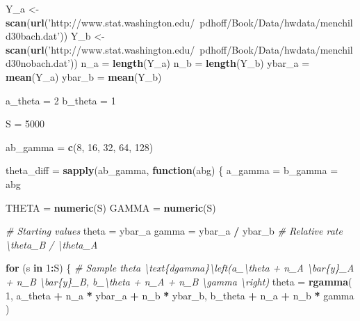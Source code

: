 \documentclass[]{article}
\newenvironment{Shaded}{\begin{snugshade}}{\end{snugshade}}
\newcommand{\CommentTok}[1]{\textcolor[rgb]{0.56,0.35,0.01}{\textit{#1}}}
\newcommand{\ControlFlowTok}[1]{\textcolor[rgb]{0.13,0.29,0.53}{\textbf{#1}}}
\newcommand{\DecValTok}[1]{\textcolor[rgb]{0.00,0.00,0.81}{#1}}
\newcommand{\KeywordTok}[1]{\textcolor[rgb]{0.13,0.29,0.53}{\textbf{#1}}}
\newcommand{\NormalTok}[1]{#1}
\newcommand{\OperatorTok}[1]{\textcolor[rgb]{0.81,0.36,0.00}{\textbf{#1}}}
\newcommand{\StringTok}[1]{\textcolor[rgb]{0.31,0.60,0.02}{#1}}
\begin{document}
\begin{Shaded}
\begin{Highlighting}[]
\NormalTok{Y_a <-}\StringTok{ }\KeywordTok{scan}\NormalTok{(}\KeywordTok{url}\NormalTok{(}\StringTok{'http://www.stat.washington.edu/~pdhoff/Book/Data/hwdata/menchild30bach.dat'}\NormalTok{))}
\NormalTok{Y_b <-}\StringTok{ }\KeywordTok{scan}\NormalTok{(}\KeywordTok{url}\NormalTok{(}\StringTok{'http://www.stat.washington.edu/~pdhoff/Book/Data/hwdata/menchild30nobach.dat'}\NormalTok{))}
\NormalTok{n_a =}\StringTok{ }\KeywordTok{length}\NormalTok{(Y_a)}
\NormalTok{n_b =}\StringTok{ }\KeywordTok{length}\NormalTok{(Y_b)}
\NormalTok{ybar_a =}\StringTok{ }\KeywordTok{mean}\NormalTok{(Y_a)}
\NormalTok{ybar_b =}\StringTok{ }\KeywordTok{mean}\NormalTok{(Y_b)}

\NormalTok{a_theta =}\StringTok{ }\DecValTok{2}
\NormalTok{b_theta =}\StringTok{ }\DecValTok{1}

\NormalTok{S =}\StringTok{ }\DecValTok{5000}

\NormalTok{ab_gamma =}\StringTok{ }\KeywordTok{c}\NormalTok{(}\DecValTok{8}\NormalTok{, }\DecValTok{16}\NormalTok{, }\DecValTok{32}\NormalTok{, }\DecValTok{64}\NormalTok{, }\DecValTok{128}\NormalTok{)}

\NormalTok{theta_diff =}\StringTok{ }\KeywordTok{sapply}\NormalTok{(ab_gamma, }\ControlFlowTok{function}\NormalTok{(abg) \{}
\NormalTok{  a_gamma =}\StringTok{ }\NormalTok{b_gamma =}\StringTok{ }\NormalTok{abg}

\NormalTok{  THETA =}\StringTok{ }\KeywordTok{numeric}\NormalTok{(S)}
\NormalTok{  GAMMA =}\StringTok{ }\KeywordTok{numeric}\NormalTok{(S)}

  \CommentTok{# Starting values}
\NormalTok{  theta =}\StringTok{ }\NormalTok{ybar_a}
\NormalTok{  gamma =}\StringTok{ }\NormalTok{ybar_a }\OperatorTok{/}\StringTok{ }\NormalTok{ybar_b  }\CommentTok{# Relative rate \textbackslash{}theta_B / \textbackslash{}theta_A}

  \ControlFlowTok{for}\NormalTok{ (s }\ControlFlowTok{in} \DecValTok{1}\OperatorTok{:}\NormalTok{S) \{}
    \CommentTok{# Sample theta \textbackslash{}text\{dgamma\}\textbackslash{}left(a_\textbackslash{}theta + n_A \textbackslash{}bar\{y\}_A + n_B \textbackslash{}bar\{y\}_B, b_\textbackslash{}theta + n_A + n_B \textbackslash{}gamma \textbackslash{}right)}
\NormalTok{    theta =}\StringTok{ }\KeywordTok{rgamma}\NormalTok{(}
      \DecValTok{1}\NormalTok{,}
\NormalTok{      a_theta }\OperatorTok{+}\StringTok{ }\NormalTok{n_a }\OperatorTok{*}\StringTok{ }\NormalTok{ybar_a }\OperatorTok{+}\StringTok{ }\NormalTok{n_b }\OperatorTok{*}\StringTok{ }\NormalTok{ybar_b,}
\NormalTok{      b_theta }\OperatorTok{+}\StringTok{ }\NormalTok{n_a }\OperatorTok{+}\StringTok{ }\NormalTok{n_b }\OperatorTok{*}\StringTok{ }\NormalTok{gamma}
\NormalTok{    )}


\end{Highlighting}
\end{Shaded}
\end{document}

